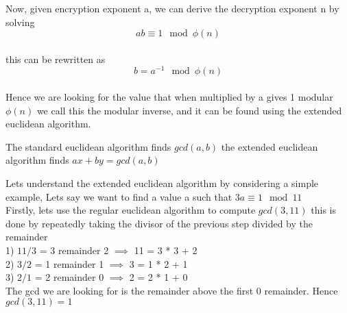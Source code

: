 \documentclass[aspectratio=169]{beamer}
\begin{document}
\begin{frame}
    \begin{center}
        Now, given encryption exponent a, we can derive the decryption exponent n by solving
        \[ab \equiv 1 \mod \phi(n)\]\\
        this can be rewritten as
        \[b = a^{-1} \mod \phi(n)\]\\
        Hence we are looking for the value that when multiplied by a gives 1 modular $\phi(n)$ we call this the modular inverse, and it can be found using the extended euclidean algorithm.        
    \end{center}
\end{frame}

\begin{frame}
    \begin{center}
            The standard euclidean algorithm finds $gcd(a, b)$ the extended euclidean algorithm finds $ax + by = gcd(a, b)$
    \end{center}
\end{frame}

\begin{frame}
    \begin{center}
        Lets understand the extended euclidean algorithm by considering a simple example, Lets say we want to find a value a such that $3a \equiv 1 \mod 11$\\

        Firstly, lets use the regular euclidean algorithm to compute $gcd(3, 11)$ this is done by repeatedly taking the divisor of the previous step divided by the remainder\\
        1) $11/3$ = 3 remainder 2 $\implies$ 11 = 3 * 3 + 2\\
        2) $3/2$ = 1 remainder 1 $\implies$ 3 = 1 * 2 + 1\\
        3) $2/1$ = 2 remainder 0 $\implies$ 2 = 2 * 1 + 0\\
        The gcd we are looking for is the remainder above the first 0 remainder. Hence $gcd(3, 11) = 1$
    \end{center}
\end{frame}
\end{document}
